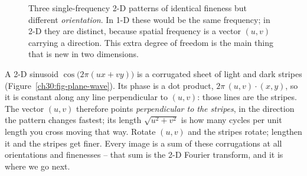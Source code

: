\begin{figure}[H]
\centering
{}
\caption{Three single-frequency 2-D patterns of identical fineness but different
\emph{orientation}. In 1-D these would be the same frequency; in 2-D they are
distinct, because spatial frequency is a vector $(u,v)$ carrying a direction. This
extra degree of freedom is the main thing that is new in two dimensions.}
\label{ch30:fig-orientation}
\end{figure}

\begin{intuitionbox}
A 2-D sinusoid
$\cos\!\big(2\pi(u x + v y)\big)$ is a corrugated sheet of light and dark stripes
(Figure~\ref{ch30:fig-plane-wave}).
Its phase is a dot product, $2\pi\,(u,v)\cdot(x,y)$, so it is constant along any
line perpendicular to $(u,v)$: those lines are the stripes. The vector $(u,v)$
therefore points \emph{perpendicular to the stripes}, in the direction
the pattern changes fastest; its length $\sqrt{u^2+v^2}$ is how many cycles per
unit length you cross moving that way. Rotate $(u,v)$ and the stripes rotate;
lengthen it and the stripes get finer. Every image is a sum of these corrugations
at all orientations and finenesses -- that sum is the 2-D Fourier transform, and
it is where we go next.
\end{intuitionbox}


